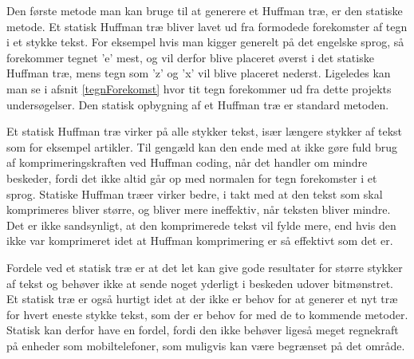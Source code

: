 Den første metode man kan bruge til at generere et Huffman træ, er den statiske metode. Et statisk Huffman træ bliver lavet ud fra formodede forekomster af tegn i et stykke tekst. For eksempel hvis man kigger generelt på det engelske sprog, så forekommer tegnet ’e’ mest, og vil derfor blive placeret øverst i det statiske Huffman træ, mens tegn som ’z’ og ’x’ vil blive placeret nederst\cite{Hufftree_2}. Ligeledes kan man se i afsnit \ref{tegnForekomst} hvor tit tegn forekommer ud fra dette projekts undersøgelser. Den statisk opbygning af et Huffman træ er standard metoden.

Et statisk Huffman træ virker på alle stykker tekst, især længere stykker af tekst som for eksempel artikler. Til gengæld kan den ende med at ikke gøre fuld brug af komprimeringskraften ved Huffman coding, når det handler om mindre beskeder, fordi det ikke altid går op med normalen for tegn forekomster i et sprog. Statiske Huffman træer virker bedre, i takt med at den tekst som skal komprimeres bliver større, og bliver mere ineffektiv, når teksten bliver mindre. Det er ikke sandsynligt, at den komprimerede tekst vil fylde mere, end hvis den ikke var komprimeret idet at Huffman komprimering er så effektivt som det er. \cite{Hufftree_3}

Fordele ved et statisk træ er at det let kan give gode resultater for større stykker af tekst og behøver ikke at sende noget yderligt i beskeden udover bitmønstret. Et statisk træ er også hurtigt idet at der ikke er behov for at generer et nyt træ for hvert eneste stykke tekst, som der er behov for med de to kommende metoder. Statisk kan derfor have en fordel, fordi den ikke behøver ligeså meget regnekraft på enheder som mobiltelefoner, som muligvis kan være begrænset på det område.
